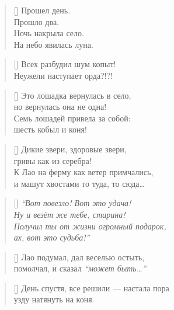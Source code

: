 \documentclass[14pt]{memoir}
\begin{document}
\begin{verse}[\versewidth]
Прошел день. \\
Прошло два. \\
Ночь накрыла село. \\
На небо явилась луна. \\
\end{verse}

\begin{verse}[\versewidth]
Всех разбудил шум копыт! \\
Неужели наступает орда?!?! \\
\end{verse}

\begin{verse}[\versewidth]
Это лошадка вернулась в село, \\
но вернулась она не одна! \\
Семь лошадей привела за собой: \\
шесть кобыл и коня! \\
\end{verse}

\begin{verse}[\versewidth]
Дикие звери, здоровые звери, \\
гривы как из серебра! \\
К Лао на ферму как ветер примчались, \\
и машут хвостами то туда, то сюда\ldots \\
\end{verse}

\begin{verse}[\versewidth]
\emph{``Вот повезло! Вот это удача! \\
Ну и везёт же тебе, старина! \\
Получил ты от жизни огромный подарок, \\
ах, вот это судьба!''} \\
\end{verse}

\begin{verse}[\versewidth]
Лао подумал, дал веселью остыть, \\
помолчал, и сказал \emph{``может быть\ldots''} \\
\end{verse}

\begin{verse}[\versewidth]
День спустя, все решили --- настала пора \\
узду натянуть на коня. \\
\end{verse}
\end{document}
